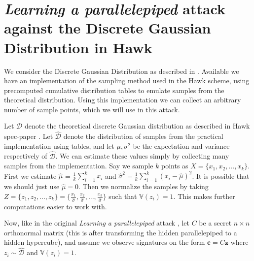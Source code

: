 \documentclass[12 pt]{article}        	%
\newcommand{\mat}[1]{\mathit{#1}}
\renewcommand{\vec}[1]{\mathbf{#1}}
\newcommand{\bb}[1]{\mathbb{#1}}
\newcommand{\dgd}{\mathcal{D}}
\newcommand{\dgdi}{\widehat{\mathcal{D}}}
\begin{document}
\title{}
\author{Eirik D. Skjerve}
\maketitle
\section{\textit{Learning a parallelepiped} attack against the Discrete Gaussian Distribution in Hawk}
We consider the Discrete Gaussian Distribution as described in \cite{HawkSpec24}. Available we have an implementation of the sampling method used in the Hawk scheme, 
using precomputed cumulative distribution tables to emulate samples from the theoretical distribution. 
Using this implementation we can collect an arbitrary number of sample points, which we will use in this attack.

Let $\dgd$ denote the theoretical discrete Gaussian distribution as described in Hawk spec-paper \cite{HawkSpec24}.
Let $\dgdi$ denote the distribution of samples from the practical implementation using tables,
and let $\mu, \sigma ^2$ be the expectation and variance respectively of $\dgdi$. We can estimate these values simply by collecting many samples from the implementation.
Say we sample $k$ points as $X = \{x_1, x_2,..., x_k\}$. First we estimate $\hat{\mu}$ = $\frac{1}{k}\sum_{i=1}^{k} x_i$ and $\hat{\sigma}^2 = \frac{1}{k}\sum_{i=1}^{k}(x_i - \hat{\mu})^2$.
It is possible that we should just use $\hat{\mu} = 0$. Then we normalize the samples by taking
$Z = \{z_1, z_2,..., z_k\} = \{\frac{x_1}{\hat{\sigma}}, \frac{x_2}{\hat{\sigma}},..., \frac{x_k}{\hat{\sigma}}\} $ such that $\bb{V}(z_i) = 1$. This makes further computations easier to work with.

Now, like in the original \textit{Learning a parallelepiped} attack \cite{NR09}, let $\mat{C}$ be a secret $n \times n$ orthonormal matrix (this is after transforming the hidden parallelepiped to a hidden hypercube),
and assume we observe signatures on the form $\vec{c} = \mat{C}\vec{z}$ where $z_i \sim \dgdi$ and $\bb{V}(z_i) = 1$.
\end{document}
